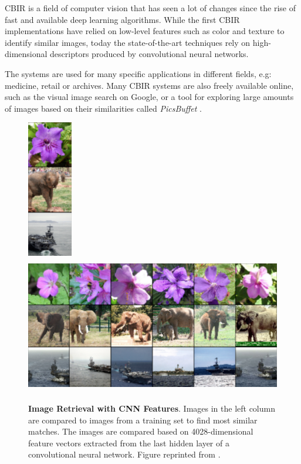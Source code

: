 \documentclass[12pt]{report}
\begin{document}
CBIR is a field of computer vision that has seen a lot of changes since the rise of fast and available deep learning algorithms. While the first CBIR implementations have relied on low-level features such as color and texture to identify similar images, today the state-of-the-art techniques rely on high-dimensional descriptors produced by convolutional neural networks.

The systems are used for many specific applications in different fields, e.g: medicine, retail or archives. Many CBIR systems are also freely available online, such as the visual image search on Google, or a tool for exploring large amounts of images based on their similarities called \textit{PicsBuffet} \cite{mackowiak_picsbuffet_nodate}.


\begin{figure}[h]
\centering
{\includegraphics[height=6cm]{02_background/CBIR/cnn_cbir_input}}
{\includegraphics[height=6cm]{02_background/CBIR/cnn_cbir_retrieval}}
\caption{\label{fig:conv_cbir} \textbf{Image Retrieval with CNN Features}. Images in the left column are compared to images from a training set to find most similar matches. The images are compared based on 4028-dimensional feature vectors extracted from the last hidden layer of a convolutional neural network. Figure reprinted from \cite{NIPS2012_4824}.}
\end{figure}
\end{document}
